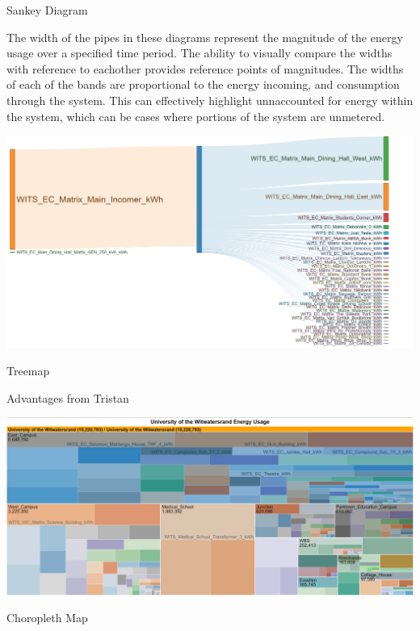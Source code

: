 \documentclass[8pt,xcolor={dvipsnames}]{beamer}
\begin{document}
{\begin{frame}{Sankey Diagram}


The width of the pipes in these diagrams represent the magnitude of the energy usage over a specified time period. The ability to visually compare the widths with reference to eachother provides reference points of magnitudes. The widths of each of the bands are proportional to the energy incoming, and consumption through the system.
This can effectively highlight unnaccounted for energy within the system, which can be cases where portions of the system are unmetered.
\begin{center}
	\includegraphics[width=\textwidth, trim=20 10 130 0, clip]{SankeyMatrix}
\end{center}
\end{frame}


\begin{frame}{Treemap}

Advantages from Tristan

\begin{center}
	\includegraphics[width=\textwidth, trim=0 0 0 10, clip]{Treemap}
\end{center}
\end{frame}


\begin{frame}{Choropleth Map}


\end{frame}}
\end{document}
